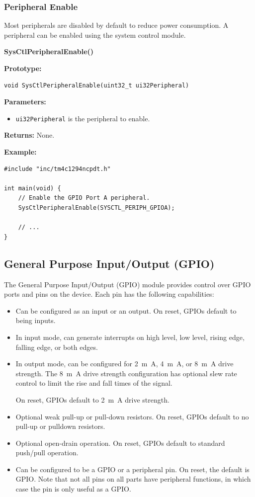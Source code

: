 \documentclass{article}
\begin{document}
\subsubsection{Peripheral Enable}
Most peripherals are disabled by default to reduce power consumption. A
peripheral can be enabled using the system control module.

\medskip
\textbf{SysCtlPeripheralEnable()}

\textbf{Prototype:}
\begin{verbatim}
void SysCtlPeripheralEnable(uint32_t ui32Peripheral)
\end{verbatim}
\textbf{Parameters:}
\begin{itemize}
    \item \texttt{ui32Peripheral} is the peripheral to enable.
\end{itemize}
\textbf{Returns:}
\medskip
None.

\medskip
\textbf{Example:}
\begin{verbatim}
#include "inc/tm4c1294ncpdt.h"

int main(void) {
    // Enable the GPIO Port A peripheral.
    SysCtlPeripheralEnable(SYSCTL_PERIPH_GPIOA);

    // ...
}
\end{verbatim}
\subsection{General Purpose Input/Output (GPIO)}
The General Purpose Input/Output (GPIO) module provides control over
GPIO ports and pins on the device. Each pin has the following
capabilities:
\begin{itemize}
    \item Can be configured as an input or an output. On reset, GPIOs
          default to being inputs.
    \item In input mode, can generate interrupts on high level, low
          level, rising edge, falling edge, or both edges.
    \item In output mode, can be configured for \qty{2}{m.A},
          \qty{4}{m.A}, or \qty{8}{m.A} drive strength. The
          \qty{8}{m.A} drive strength configuration has optional slew
          rate control to limit the rise and fall times of the signal.

          On reset, GPIOs default to \qty{2}{m.A} drive strength.
    \item Optional weak pull-up or pull-down resistors. On reset, GPIOs
          default to no pull-up or pulldown resistors.
    \item Optional open-drain operation. On reset, GPIOs default to
          standard push/pull operation.
    \item Can be configured to be a GPIO or a peripheral pin. On reset,
          the default is GPIO. Note that not all pins on all parts have
          peripheral functions, in which case the pin is only useful as
          a GPIO.
\end{itemize}
\end{document}
